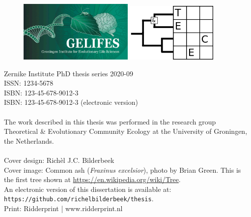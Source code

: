 \begin{titlepage}
	\vfill
	\begin{figure}[!h]
		\includegraphics[width=0.5\textwidth]{images/frontmatter/gelifes_header_600x320.png}
		\includegraphics[width=0.4\textwidth]{images/frontmatter/tece_logo_2.png}
	\end{figure}
	\noindent
	{\small 
		Zernike Institute PhD thesis series 2020-09 \\
		ISSN: 1234-5678\\
		ISBN:	123-45-678-9012-3 \\
		ISBN: 123-45-678-9012-3 (electronic version) \\
		\\
		The work described in this thesis was performed in the research group 
    Theoretical \& Evolutionary Community Ecology at the University of Groningen, the Netherlands. \\
		\\
		Cover design: Rich\`el J.C. Bilderbeek\\
		Cover image: Common ash (\textit{Fraxinus excelsior}), photo by Brian Green. 
    This is the first tree shown at \url{https://en.wikipedia.org/wiki/Tree}.
		\\
		An electronic version of this dissertation is available at: \\
	  \verb;https://github.com/richelbilderbeek/thesis;. \\
		Print: Ridderprint | www.ridderprint.nl \\
		} 	
	
	
	\clearpage
	
	
	
\end{titlepage}
